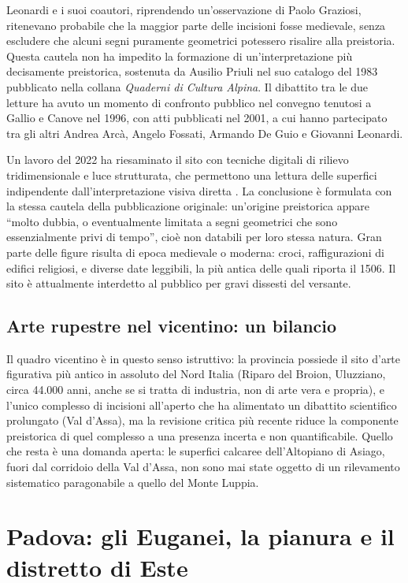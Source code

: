 Leonardi e i suoi coautori, riprendendo un'osservazione di Paolo Graziosi, ritenevano probabile che la maggior parte delle incisioni fosse medievale, senza escludere che alcuni segni puramente geometrici potessero risalire alla preistoria. Questa cautela non ha impedito la formazione di un'interpretazione più decisamente preistorica, sostenuta da Ausilio Priuli nel suo catalogo del 1983 pubblicato nella collana \emph{Quaderni di Cultura Alpina}. Il dibattito tra le due letture ha avuto un momento di confronto pubblico nel convegno tenutosi a Gallio e Canove nel 1996, con atti pubblicati nel 2001, a cui hanno partecipato tra gli altri Andrea Arcà, Angelo Fossati, Armando De Guio e Giovanni Leonardi.

Un lavoro del 2022 ha riesaminato il sito con tecniche digitali di rilievo tridimensionale e luce strutturata, che permettono una lettura delle superfici indipendente dall'interpretazione visiva diretta \citep{bettineschi2022}. La conclusione è formulata con la stessa cautela della pubblicazione originale: un'origine preistorica appare ``molto dubbia, o eventualmente limitata a segni geometrici che sono essenzialmente privi di tempo'', cioè non databili per loro stessa natura. Gran parte delle figure risulta di epoca medievale o moderna: croci, raffigurazioni di edifici religiosi, e diverse date leggibili, la più antica delle quali riporta il 1506. Il sito è attualmente interdetto al pubblico per gravi dissesti del versante.

\subsection{Arte rupestre nel vicentino: un bilancio}

Il quadro vicentino è in questo senso istruttivo: la provincia possiede il sito d'arte figurativa più antico in assoluto del Nord Italia (Riparo del Broion, Uluzziano, circa 44.000 anni, anche se si tratta di industria, non di arte vera e propria), e l'unico complesso di incisioni all'aperto che ha alimentato un dibattito scientifico prolungato (Val d'Assa), ma la revisione critica più recente riduce la componente preistorica di quel complesso a una presenza incerta e non quantificabile. Quello che resta è una domanda aperta: le superfici calcaree dell'Altopiano di Asiago, fuori dal corridoio della Val d'Assa, non sono mai state oggetto di un rilevamento sistematico paragonabile a quello del Monte Luppia.

\section{Padova: gli Euganei, la pianura e il distretto di Este}

